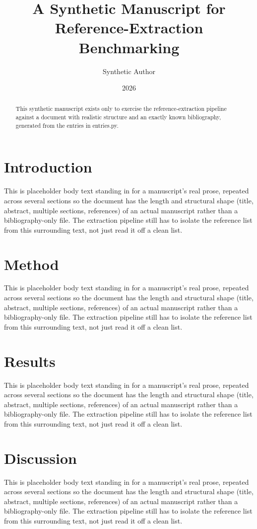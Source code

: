 \documentclass[twocolumn]{article}
\title{A Synthetic Manuscript for Reference-Extraction Benchmarking}
\author{Synthetic Author}
\date{2026}
\begin{document}
\maketitle

\begin{abstract}
This synthetic manuscript exists only to exercise the reference-extraction pipeline against a document with realistic structure and an exactly known bibliography, generated from the entries in entries.py.
\end{abstract}

\section{Introduction}
This is placeholder body text standing in for a manuscript's real prose, repeated across several sections so the document has the length and structural shape (title, abstract, multiple sections, references) of an actual manuscript rather than a bibliography-only file. The extraction pipeline still has to isolate the reference list from this surrounding text, not just read it off a clean list.

\section{Method}
This is placeholder body text standing in for a manuscript's real prose, repeated across several sections so the document has the length and structural shape (title, abstract, multiple sections, references) of an actual manuscript rather than a bibliography-only file. The extraction pipeline still has to isolate the reference list from this surrounding text, not just read it off a clean list.

\section{Results}
This is placeholder body text standing in for a manuscript's real prose, repeated across several sections so the document has the length and structural shape (title, abstract, multiple sections, references) of an actual manuscript rather than a bibliography-only file. The extraction pipeline still has to isolate the reference list from this surrounding text, not just read it off a clean list.

\section{Discussion}
This is placeholder body text standing in for a manuscript's real prose, repeated across several sections so the document has the length and structural shape (title, abstract, multiple sections, references) of an actual manuscript rather than a bibliography-only file. The extraction pipeline still has to isolate the reference list from this surrounding text, not just read it off a clean list.

\nocite{*}
\printbibliography
\end{document}
